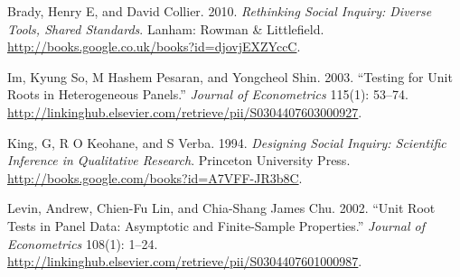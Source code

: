\documentclass[11pt,article,oneside]{memoir}
\begin{document}
Brady, Henry E, and David Collier. 2010. \emph{Rethinking Social
Inquiry: Diverse Tools, Shared Standards}. Lanham: Rowman \&
Littlefield. \url{http://books.google.co.uk/books?id=djovjEXZYccC}.

Im, Kyung So, M Hashem Pesaran, and Yongcheol Shin. 2003. ``Testing for
Unit Roots in Heterogeneous Panels.'' \emph{Journal of Econometrics}
115(1): 53--74.
\url{http://linkinghub.elsevier.com/retrieve/pii/S0304407603000927}.

King, G, R O Keohane, and S Verba. 1994. \emph{Designing Social Inquiry:
Scientific Inference in Qualitative Research}. Princeton University
Press. \url{http://books.google.com/books?id=A7VFF-JR3b8C}.

Levin, Andrew, Chien-Fu Lin, and Chia-Shang James Chu. 2002. ``Unit Root
Tests in Panel Data: Asymptotic and Finite-Sample Properties.''
\emph{Journal of Econometrics} 108(1): 1--24.
\url{http://linkinghub.elsevier.com/retrieve/pii/S0304407601000987}.
\end{document}
